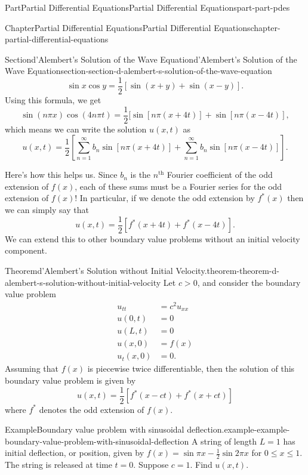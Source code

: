 \documentclass[twoside,10pt,]{book}
\numberwithin{equation}{part}
\renewcommand{\th}{\text{th}}
\newcommand{\gt}{>}
\newcommand{\amp}{&}
\begin{document}
\begin{partptx}{Part}{Partial Differential Equations}{}{Partial Differential Equations}{}{}{part-part-pdes}
\begin{chapterptx}{Chapter}{Partial Differential Equations}{}{Partial Differential Equations}{}{}{chapter-partial-differential-equations}
\begin{sectionptx}{Section}{d'Alembert's Solution of the Wave Equation}{}{d'Alembert's Solution of the Wave Equation}{}{}{section-section-d-alembert-s-solution-of-the-wave-equation}
%
\begin{equation*}
\sin x\cos y = \frac{1}{2}[\sin(x+y)+\sin(x-y)].
\end{equation*}
Using this formula, we get%
\begin{equation*}
\sin(n\pi x)\cos(4n\pi t) = \frac{1}{2}[\sin[n\pi(x+4t)]+\sin[n\pi(x-4t)],
\end{equation*}
which means we can write the solution \(u(x,t)\) as%
\begin{equation*}
u(x,t) = \frac{1}{2}\left[\sum_{n=1}^{\infty}b_{n}\sin[n\pi(x+4t)] + \sum_{n=1}^{\infty}b_{n}\sin[n\pi(x-4t)]\right].
\end{equation*}
%
\par
Here's how this helps us. Since \(b_{n}\) is the \(n^{\th}\) Fourier coefficient of the odd extension of \(f(x)\), each of these sums must be a Fourier series for the odd extension of \(f(x)\)! In particular, if we denote the odd extension by \(f^{*}(x)\) then we can simply say that%
%
\begin{equation*}
u(x,t) = \frac{1}{2}[f^{*}(x+4t)+f^{*}(x-4t)].
\end{equation*}
We can extend this to other boundary value problems without an initial velocity component.%
\begin{theorem}{Theorem}{d'Alembert's Solution without Initial Velocity.}{}{theorem-theorem-d-alembert-s-solution-without-initial-velocity}%
%
Let \(c\gt0\), and consider the boundary value problem%
%
\begin{align*}
u_{tt} \amp = c^{2}u_{xx} \\
u(0,t) \amp = 0 \\
u(L,t) \amp = 0 \\
u(x,0) \amp = f(x) \\
u_{t}(x,0) \amp = 0 \text{.}
\end{align*}
Assuming that \(f(x)\) is piecewise twice differentiable, then the solution of this boundary value problem is given by%
\begin{equation*}
u(x,t) = \frac{1}{2}[f^{*}(x-ct)+f^{*}(x+ct)]
\end{equation*}
where \(f^{*}\) denotes the odd extension of \(f(x)\).%
\end{theorem}
\begin{example}{Example}{Boundary value problem with sinusoidal deflection.}{example-example-boundary-value-problem-with-sinusoidal-deflection}%
A string of length \(L=1\) has initial deflection, or position, given by \(f(x) = \sin\pi x - \frac{1}{2}\sin2\pi x\) for \(0\leq x\leq 1\). The string is released at time \(t=0\). Suppose \(c=1\). Find \(u(x,t)\).%

\end{example}
\end{sectionptx}
\end{chapterptx}
\end{partptx}
\end{document}

